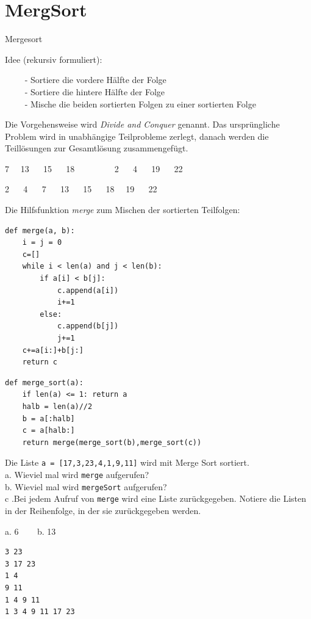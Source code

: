 \documentclass{beamer}
\begin{document}
\section{MergSort}
\begin{frame}[fragile]
Mergesort

Idee (rekursiv formuliert): 

~~~~ - Sortiere die vordere Hälfte der Folge \\ 
~~~~ - Sortiere die hintere Hälfte der Folge \\ 
~~~~ - Mische die beiden sortierten Folgen zu einer sortierten Folge \pause

Die Vorgehensweise wird \textit{Divide and Conquer} genannt. Das ursprüngliche Problem wird in 
unabhängige Teilprobleme zerlegt, danach werden die Teillösungen zur Gesamtlösung zusammengefügt. \pause

7~~ 13 ~~ 15 ~~ 18   ~~~~  ~~~~2 ~~  4 ~~ 19 ~~ 22  \pause

2 ~~ 4 ~~ 7 ~~ 13 ~~ 15 ~~ 18 ~~19 ~~ 22  
\end{frame}

\begin{frame}[fragile]

Die Hilfsfunktion \textit{merge} zum Mischen der sortierten Teilfolgen:  
\begin{lstlisting} 
def merge(a, b):
    i = j = 0
    c=[]
    while i < len(a) and j < len(b):
        if a[i] < b[j]:
            c.append(a[i])
            i+=1
        else:
            c.append(b[j])
            j+=1
    c+=a[i:]+b[j:]  
    return c
\end{lstlisting} 
\end{frame}


\begin{frame}[fragile]

\begin{lstlisting} 
def merge_sort(a):
    if len(a) <= 1: return a
    halb = len(a)//2
    b = a[:halb]
    c = a[halb:]
    return merge(merge_sort(b),merge_sort(c))
\end{lstlisting} 
\end{frame}





\begin{frame}[fragile]

Die Liste \texttt{a = [17,3,23,4,1,9,11]} wird mit Merge Sort sortiert. \\
a. Wieviel mal wird \texttt{merge} aufgerufen?  \\
b. Wieviel mal wird \texttt{mergeSort} aufgerufen? \\
c .Bei jedem Aufruf von \texttt{merge} wird eine Liste zurückgegeben.
Notiere die Listen in der Reihenfolge, in der sie zurückgegeben werden.  \pause
 
a. 6   ~~~ b. 13
\begin{lstlisting}
3 23
3 17 23
1 4
9 11
1 4 9 11
1 3 4 9 11 17 23
\end{lstlisting}  

\end{frame}
\end{document}
